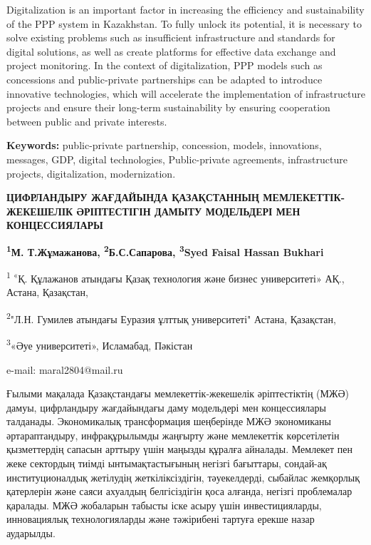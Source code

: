 Digitalization is an important factor in increasing the efficiency and
sustainability of the PPP system in Kazakhstan. To fully unlock its
potential, it is necessary to solve existing problems such as
insufficient infrastructure and standards for digital solutions, as well
as create platforms for effective data exchange and project monitoring.
In the context of digitalization, PPP models such as concessions and
public-private partnerships can be adapted to introduce innovative
technologies, which will accelerate the implementation of infrastructure
projects and ensure their long-term sustainability by ensuring
cooperation between public and private interests.

{\bfseries Keywords:} public-private partnership, concession, models,
innovations, messages, GDP, digital technologies, Public-private
agreements, infrastructure projects, digitalization, modernization.

\begin{articleheader}
{\bfseries ЦИФРЛАНДЫРУ ЖАҒДАЙЫНДА ҚАЗАҚСТАННЫҢ МЕМЛЕКЕТТІК-ЖЕКЕШЕЛІК ӘРІПТЕСТІГІН ДАМЫТУ МОДЕЛЬДЕРІ МЕН КОНЦЕССИЯЛАРЫ}

{\bfseries
\textsuperscript{1}М. Т.Жұмажанова\textsuperscript{\envelope },
\textsuperscript{2}Б.С.Сапарова,
\textsuperscript{3}Syed Faisal Hassan Bukhari
}
\end{articleheader}

\begin{affiliation}
\textsuperscript{1 «}Қ. Құлажанов атындағы Қазақ технология және бизнес университеті» АҚ., Астана, Қазақстан,

\textsuperscript{2}"Л.Н. Гумилев атындағы Еуразия ұлттық университеті" Астана, Қазақстан,

\textsuperscript{3}«Әуе университеті», Исламабад, Пәкістан

e-mail: maral2804@mail.ru
\end{affiliation}

Ғылыми мақалада Қазақстандағы мемлекеттік-жекешелік әріптестіктің (МЖӘ)
дамуы, цифрландыру жағдайындағы даму модельдері мен концессиялары
талданады. Экономикалық трансформация шеңберінде МЖӘ экономиканы
әртараптандыру, инфрақұрылымды жаңғырту және мемлекеттік көрсетілетін
қызметтердің сапасын арттыру үшін маңызды құралға айналады. Мемлекет пен
жеке сектордың тиімді ынтымақтастығының негізгі бағыттары, сондай-ақ
институционалдық жетілудің жеткіліксіздігін, тәуекелдерді, сыбайлас
жемқорлық қатерлерін және саяси ахуалдың белгісіздігін қоса алғанда,
негізгі проблемалар қаралады. МЖӘ жобаларын табысты іске асыру үшін
инвестицияларды, инновациялық технологияларды және тәжірибені тартуға
ерекше назар аударылды.

